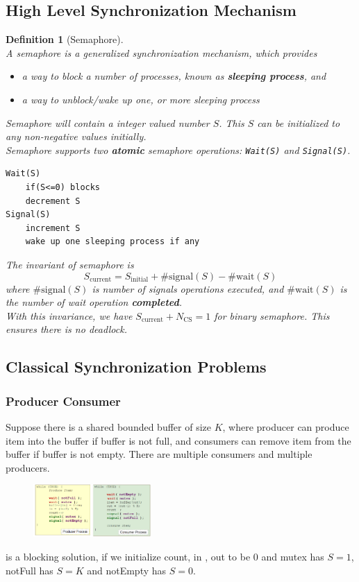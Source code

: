 \documentclass[12pt]{article}
\newtheorem{definition}{Definition}[section]
\theoremstyle{definition}
\begin{document}
\subsection{High Level Synchronization Mechanism}
\begin{definition}[Semaphore]
\hfill\\\normalfont A semaphore is a generalized synchronization mechanism, which provides 
\begin{itemize}
  \item a way to block a number of processes, known as \textbf{sleeping process}, and 
  \item a way to unblock/wake up one, or more sleeping process
\end{itemize}
Semaphore will contain a integer valued number $S$. This $S$ can be initialized to any non-negative values initially.\\
Semaphore supports two \textbf{atomic} semaphore operations: \texttt{Wait(S)} and \texttt{Signal(S)}.
\begin{verbatim}
Wait(S)
    if(S<=0) blocks
    decrement S
Signal(S)
    increment S
    wake up one sleeping process if any
\end{verbatim}
The invariant of semaphore is
\[
S_\text{current} = S_\text{initial} + \#\text{signal}(S) - \#\text{wait}(S)
\]
where $\#\text{signal}(S)$ is number of signals operations executed, and $\#\text{wait}(S)$ is the number of wait operation \textbf{completed}.\\
With this invariance, we have $S_\text{current}+N_\text{CS}=1$ for binary semaphore. This ensures there is no deadlock.
\end{definition}
\subsection{Classical Synchronization Problems}
\subsubsection{Producer Consumer}
Suppose there is a shared bounded buffer of size $K$, where producer can produce item into the buffer if buffer is not full, and consumers can remove item from the buffer if buffer is not empty. There are multiple consumers and multiple producers.
\begin{figure}[h]
\centering
\includegraphics[width=0.4\textwidth]{5_1.png}
\end{figure}
is a blocking solution, if we initialize count, in , out to be $0$ and mutex has $S=1$, notFull has $S=K$ and notEmpty has $S=0$.
\end{document}
